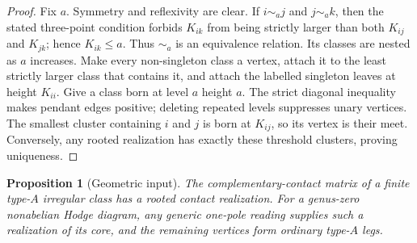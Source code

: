 \documentclass[11pt,a4paper]{amsart}
\theoremstyle{plain}
\newtheorem{proposition}[theorem]{Proposition}
\theoremstyle{definition}
\begin{document}
\begin{proof}
Fix $a$.  Symmetry and reflexivity are clear.  If $i\sim_a j$ and $j\sim_a k$, then the stated
three-point condition forbids $K_{ik}$ from being strictly larger than both $K_{ij}$ and $K_{jk}$;
hence $K_{ik}\le a$.  Thus $\sim_a$ is an equivalence relation.  Its classes are nested as $a$
increases.  Make every non-singleton class a vertex, attach it to the least strictly larger class
that contains it, and attach the labelled singleton leaves at height $K_{ii}$.  Give a class born
at level $a$ height $a$.  The strict diagonal inequality makes pendant edges positive; deleting
repeated levels suppresses unary vertices.  The smallest cluster containing $i$ and $j$ is born at
$K_{ij}$, so its vertex is their meet.  Conversely, any rooted realization has exactly these
threshold clusters, proving uniqueness.
\end{proof}

\begin{proposition}[Geometric input]\label{prop:geometric-input}
The complementary-contact matrix of a finite type-$A$ irregular class has a rooted contact
realization.  For a genus-zero nonabelian Hodge diagram, any generic one-pole reading supplies such
a realization of its core, and the remaining vertices form ordinary type-$A$ legs.
\end{proposition}
\end{document}
